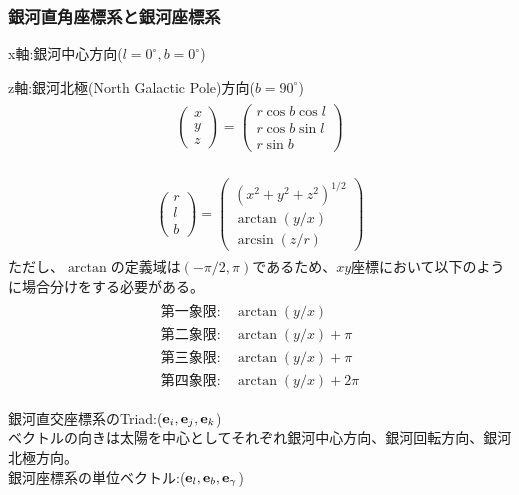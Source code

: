 \subsubsection{銀河直角座標系と銀河座標系}
x軸:銀河中心方向($l=0^{\circ}, b=0^{\circ}$)

z軸:銀河北極(North Galactic Pole)方向($b=90^{\circ}$)
\begin{align}
\begin{aligned}
	\left(
	\begin{array}{c}
	 	x\\
		y\\
		z
	\end{array}
	\right)
	=
	\left(
	\begin{array}{c}
	 	r\cos{b}\cos{l}\\
	 	r\cos{b}\sin{l}\\
	 	r\sin{b}
	\end{array}
	\right)
\end{aligned}
\end{align}

\begin{align}
\begin{aligned}
	\left(
	\begin{array}{c}
	 	r\\
		l\\
		b
	\end{array}
	\right)
	=
	\left(
	\begin{array}{c}
	 	(x^2 + y^2 + z^2)^{1/2}\\
	 	\arctan{(y/x)}\\
	 	\arcsin{(z/r)}
	\end{array}
	\right)
\end{aligned}
\end{align}
ただし、$\arctan$の定義域は$(-\pi/2, \pi)$であるため、$xy$座標において以下のように場合分けをする必要がある。
\begin{align}
\begin{aligned}
	第一象限 : &\arctan{(y/x)}\\
	第二象限 : &\arctan{(y/x)} + \pi\\
	第三象限 : &\arctan{(y/x)} + \pi\\
	第四象限 : &\arctan{(y/x)} + 2\pi
\end{aligned}
\end{align}


銀河直交座標系のTriad:(${\bf e}_i,{\bf e}_j,{\bf e}_k$)\\
ベクトルの向きは太陽を中心としてそれぞれ銀河中心方向、銀河回転方向、銀河北極方向。\\
銀河座標系の単位ベクトル:(${\bf e}_l,{\bf e}_b,{\bf e}_{\gamma}$)

